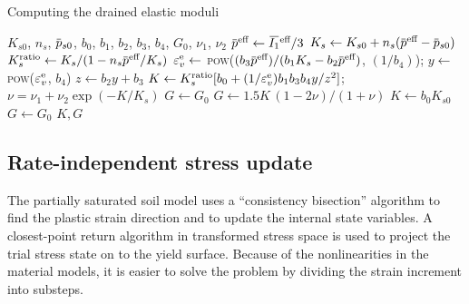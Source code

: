   \begin{breakablealgorithm}
  \caption{Computing the drained elastic moduli}
  \begin{algorithmic}[1]
    \Require $K_{s0}$, $n_s$, $\pbar_{s0}$, $b_0$, $b_1$, $b_2$, $b_3$, $b_4$, $G_0$, $\nu_1$, $\nu_2$
        \State $\pbar^\Teff \leftarrow \Ionebar^\Teff/3$
        \State $K_s \leftarrow K_{s0} + n_s (\pbar^\Teff - \pbar_{s0})$
        \State $K_s^\Tratio \leftarrow K_s/(1 - n_s \pbar^\Teff/K_s)$
        \State $\varepsilon^{\text{e}}_v \leftarrow$ \textsc{pow}($(b_3 \pbar^\Teff)/(b_1K_s - b_2\pbar^\Teff)$, $(1/b_4)$);
        \State $y \leftarrow $ \textsc{pow}($\varepsilon^{\text{e}}_v$, $b_4$)
        \State $z \leftarrow b_2y + b_3$
        \State $K \leftarrow K_s^{\text{ratio}}[b_0 + (1/\varepsilon^{\text{e}}_v)b_1b_3b_4y/z^2]$;
        \State $\nu = \nu_1 + \nu_2\exp(-K/K_s)$
        \State $ G \leftarrow G_0$
          \State $G \leftarrow 1.5K\,(1-2\nu)/(1+\nu)$
        \EndIf
      \Else
        \State $K \leftarrow b_0K_{s0}$
        \State $G \leftarrow G_0$
      \EndIf
      \State \Return $K, G$
    \EndProcedure
  \end{algorithmic}
  \end{breakablealgorithm}


\subsection{Rate-independent stress update}
  The partially saturated soil model uses a ``consistency bisection'' 
  algorithm
  to find the plastic strain direction and to update the internal state variables.  A closest-point
  return algorithm in transformed stress space is used to project the trial stress state on to the
  yield surface. Because of the nonlinearities in the material models, it is easier to solve 
  the problem by dividing the strain increment into substeps.

